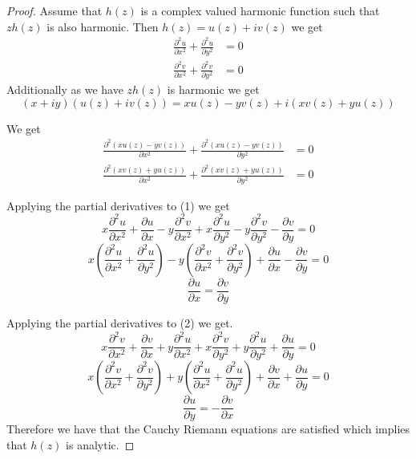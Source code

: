 \documentclass[letter,12pt]{article}
\begin{document}
    \begin{proof}
        Assume that $h(z)$ is a complex valued harmonic function such that $zh(z)$ is also harmonic. Then $h(z)=u(z)+iv(z)$ we get \begin{align*}
            \frac{\partial^2 u}{\partial x^2}+\frac{\partial^2 u}{\partial y^2 } & =0 \\ \frac{\partial^2 v}{\partial x^2}+\frac{\partial ^2 v}{\partial y^2} & =0
        \end{align*} 
        Additionally as we have $zh(z)$ is harmonic we get $$(x+iy)(u(z)+iv(z))=xu(z)-yv(z) +i(xv(z)+yu(z))$$
         
        We get \begin{align}
            \frac{\partial ^2(xu(z)-yv(z))}{\partial x^2}+\frac{\partial ^2 (xu(z)-yv(z))}{\partial y^2} &=0 \\ \frac{\partial ^2(xv(z)+yu(z))}{\partial x^2}+\frac{\partial ^2 (xv(z)+yu(z))}{\partial y^2} &=0
        \end{align}

        Applying the partial derivatives to (1) we get 
        \[
            x\frac{\partial ^2 u}{\partial x^2}+ \frac{\partial u}{\partial x}-y\frac{\partial^2 v}{\partial x^2}+ x\frac{\partial ^2 u}{\partial y^2}- y\frac{\partial ^2 v}{\partial y^2}- \frac{\partial v}{\partial y}=0
        \]
        \[
            x(\frac{\partial^2 u}{\partial x^2}+\frac{\partial ^2 u}{\partial y^2})-y(\frac{\partial ^2 v}{\partial x^2}+\frac{\partial ^2 v}{\partial y^2})+ \frac{\partial u}{\partial x}-\frac{\partial v}{\partial y}=0
        \]
        \[
            \frac{\partial u}{\partial x}=\frac{\partial v}{\partial y}
        \]
        
        Applying the partial derivatives to (2) we get.
        \[
            x\frac{\partial ^2 v}{\partial x^2}+ \frac{\partial v}{\partial x}+ y\frac{\partial ^2 u}{\partial x^2 } + x\frac{\partial ^2 v}{\partial y^2}+y\frac{\partial ^2u}{\partial y^2}+ \frac{\partial u}{\partial y}=0
        \] 
        \[
            x(\frac{\partial ^2 v}{\partial x^2}+\frac{\partial ^2 v}{\partial y^2})+y(\frac{\partial ^2 u}{\partial x^2}+\frac{\partial^2 u}{\partial y^2})+\frac{\partial v}{\partial x}+\frac{\partial u}{\partial y}=0
        \]
        \[
            \frac{\partial u}{\partial y}=-\frac{\partial v}{\partial x}
        \]
        Therefore we have that the Cauchy Riemann equations are satisfied which implies that $h(z)$ is analytic.

    \end{proof}
\end{document}

